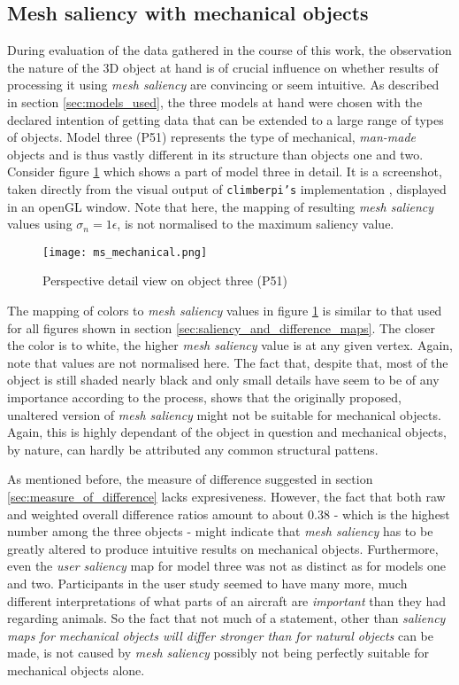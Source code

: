 		\subsection{Mesh saliency with mechanical objects}
		\label{sec:mesh_saliency_with_mechanical_objects}
During evaluation of the data gathered in the course of this work, the observation the nature of the 3D object at hand is of crucial influence on whether results of processing it using \textit{mesh saliency} are convincing or seem intuitive. As described in section \ref{sec:models_used}, the three models at hand were chosen with the declared intention of getting data that can be extended to a large range of types of objects. Model three (P51) represents the type of mechanical, \textit{man-made} objects and is thus vastly different in its structure than objects one and two. Consider figure \ref{fig:results_ms_mechanical} which shows a part of model three in detail. It is a screenshot, taken directly from the visual output of \texttt{climberpi's} implementation \cite{clms}, displayed in an openGL window. Note that here, the mapping of resulting \textit{mesh saliency} values using $\sigma_{n} = 1\epsilon$, is not normalised to the maximum saliency value.

\begin{figure}[!h]
	\centering
	\texttt{[image: ms\_mechanical.png]}\\ %
	\caption{Perspective detail view on object three (P51)}
	\label{fig:results_ms_mechanical}
\end{figure}

The mapping of colors to \textit{mesh saliency} values in figure \ref{fig:results_ms_mechanical} is similar to that used for all figures shown in section \ref{sec:saliency_and_difference_maps}. The closer the color is to white, the higher \textit{mesh saliency} value is at any given vertex. Again, note that values are not normalised here. The fact that, despite that, most of the object is still shaded nearly black and only small details have seem to be of any importance according to the process, shows that the originally proposed, unaltered version of \textit{mesh saliency} might not be suitable for mechanical objects. Again, this is highly dependant of the object in question and mechanical objects, by nature, can hardly be attributed any common structural pattens.

As mentioned before, the measure of difference suggested in section \ref{sec:measure_of_difference} lacks expresiveness. However, the fact that both raw and weighted overall difference ratios amount to about 0.38 - which is the highest number among the three objects - might indicate that \textit{mesh saliency} has to be greatly altered to produce intuitive results on mechanical objects. Furthermore, even the \textit{user saliency} map for model three was not as distinct as for models one and two. Participants in the user study seemed to have many more, much different interpretations of what parts of an aircraft are \textit{important} than they had regarding animals. So the fact that not much of a statement, other than \textit{saliency maps for mechanical objects will differ stronger than for natural objects} can be made, is not caused by \textit{mesh saliency} possibly not being perfectly suitable for mechanical objects alone.
